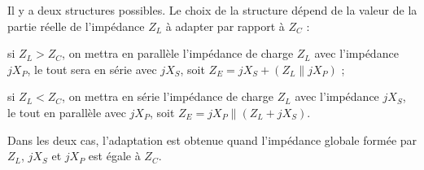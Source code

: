 \begin{prop}
  Il y a deux structures possibles. Le choix de la structure dépend de la valeur de la
  partie réelle de l'impédance $Z_L$ à adapter par rapport à $Z_C$ :
  \begin{subpart}
    \item si $Z_L > Z_C$, on mettra en parallèle l'impédance de charge $Z_L$ avec
      l'impédance $jX_P$, le tout sera en série avec $jX_S$, soit
      $Z_E = jX_S + (Z_L \parallel jX_P)$ ;
    \item si $Z_L < Z_C$, on mettra en série l'impédance de charge $Z_L$ avec
      l'impédance $jX_S$, le tout en parallèle avec $jX_P$, soit
      $Z_E = jX_P \parallel (Z_L + jX_S)$.
  \end{subpart}
  Dans les deux cas, l'adaptation est obtenue quand l'impédance globale formée par
  $Z_L$, $jX_S$ et $jX_P$ est égale à $Z_C$.
\end{prop}

